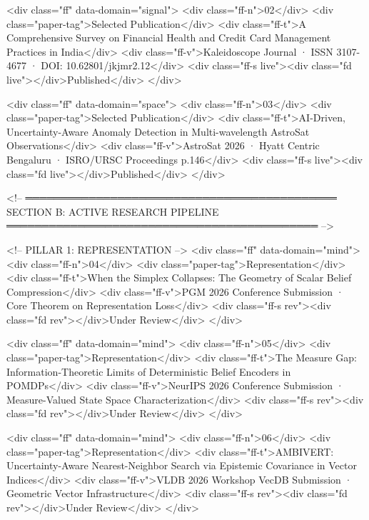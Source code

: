       <div class="ff" data-domain="signal">
        <div class="ff-n">02</div>
        <div class="paper-tag">Selected Publication</div>
        <div class="ff-t">A Comprehensive Survey on Financial Health and Credit Card Management Practices in India</div>
        <div class="ff-v">Kaleidoscope Journal · ISSN 3107-4677 · DOI: 10.62801/jkjmr2.12</div>
        <div class="ff-s live"><div class="fd live"></div>Published</div>
      </div>

      <div class="ff" data-domain="space">
        <div class="ff-n">03</div>
        <div class="paper-tag">Selected Publication</div>
        <div class="ff-t">AI-Driven, Uncertainty-Aware Anomaly Detection in Multi-wavelength AstroSat Observations</div>
        <div class="ff-v">AstroSat 2026 · Hyatt Centric Bengaluru · ISRO/URSC Proceedings p.146</div>
        <div class="ff-s live"><div class="fd live"></div>Published</div>
      </div>

      <!-- ════════════════════════════════════════════
           SECTION B: ACTIVE RESEARCH PIPELINE
      ════════════════════════════════════════════ -->
      
      <!-- PILLAR 1: REPRESENTATION -->
      <div class="ff" data-domain="mind">
        <div class="ff-n">04</div>
        <div class="paper-tag">Representation</div>
        <div class="ff-t">When the Simplex Collapses: The Geometry of Scalar Belief Compression</div>
        <div class="ff-v">PGM 2026 Conference Submission · Core Theorem on Representation Loss</div>
        <div class="ff-s rev"><div class="fd rev"></div>Under Review</div>
      </div>

      <div class="ff" data-domain="mind">
        <div class="ff-n">05</div>
        <div class="paper-tag">Representation</div>
        <div class="ff-t">The Measure Gap: Information-Theoretic Limits of Deterministic Belief Encoders in POMDPs</div>
        <div class="ff-v">NeurIPS 2026 Conference Submission · Measure-Valued State Space Characterization</div>
        <div class="ff-s rev"><div class="fd rev"></div>Under Review</div>
      </div>

      <div class="ff" data-domain="mind">
        <div class="ff-n">06</div>
        <div class="paper-tag">Representation</div>
        <div class="ff-t">AMBIVERT: Uncertainty-Aware Nearest-Neighbor Search via Epistemic Covariance in Vector Indices</div>
        <div class="ff-v">VLDB 2026 Workshop VecDB Submission · Geometric Vector Infrastructure</div>
        <div class="ff-s rev"><div class="fd rev"></div>Under Review</div>
      </div>

